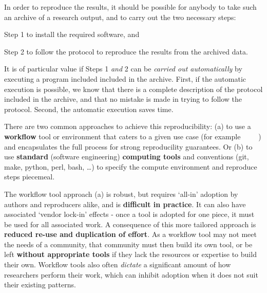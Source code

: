 In order to reproduce the results, it should be possible for anybody to take such an archive of a research
output, and to carry out the two necessary steps:
\begin{compactitem}
\item Step 1 to install the required software, and
\item Step 2 to follow the protocol to reproduce the results from the archived data.
\end{compactitem}

It is of particular value if Steps 1 \emph{and} 2 can be \emph{carried out
  automatically} by executing a program included included in the
archive. First, if the automatic execution is possible, we know that there is a
complete description of the protocol included in the archive, and that no
mistake is made in trying to follow the protocol. Second, the automatic
execution saves time.

There are two common approaches to achieve this reproducibility: (a) to use a
\textbf{workflow} tool or environment that caters to a given use case (for example
~\cite{reana2019} ~\cite{Afgan2018} ~\cite{Mlder2021})
and encapsulates the full process for strong reproducility guarantees.
Or (b) to use \textbf{standard} (software engineering) \textbf{computing tools} and conventions
(git, make, python, perl, bash, \ldots)
to specify the compute environment and reproduce steps piecemeal.

The workflow tool approach (a) is robust, but requires `all-in' adoption by authors and reproducers alike,
and is \textbf{difficult in practice}. It can also have associated `vendor lock-in' effects
- once a tool is adopted for one piece, it must be used for all associated work.
A consequence of this more tailored approach is \textbf{reduced re-use and duplication of effort}.
As a workflow tool may not meet the needs of a community,
that community must then build its own tool, or be left \textbf{without appropriate tools}
if they lack the resources or expertise to build their own.
Workflow tools also often \emph{dictate} a significant amount of how researchers perform their work,
which can inhibit adoption when it does not suit their existing patterns.


